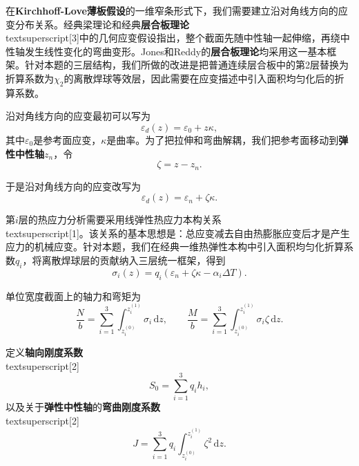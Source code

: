 \documentclass[draft,12pt,a4paper]{ctexart}
\theoremstyle{definition}
\newcommand{\diff}{\mathrm{d}}
\begin{document}
在\textbf{Kirchhoff-Love薄板假设}的一维窄条形式下，我们需要建立沿对角线方向的应变分布关系。经典梁理论和经典\textbf{层合板理论}\\textsuperscript{[3]}中的几何应变假设指出，整个截面先随中性轴一起伸缩，再绕中性轴发生线性变化的弯曲变形。Jones和Reddy的\textbf{层合板理论}均采用这一基本框架。针对本题的三层结构，我们所做的改进是把普通连续层合板中的第2层替换为折算系数为$\chi_2$的离散焊球等效层，因此需要在应变描述中引入面积均匀化后的折算系数。

沿对角线方向的应变最初可以写为
\begin{equation}\label{eq:strain}
\varepsilon_d(z)=\varepsilon_0+z\kappa,
\end{equation}
其中$\varepsilon_0$是参考面应变，$\kappa$是曲率。为了把拉伸和弯曲解耦，我们把参考面移动到\textbf{弹性中性轴}$z_n$，令
\begin{equation}
\zeta=z-z_n.
\end{equation}

于是沿对角线方向的应变改写为
\begin{equation}\label{eq:strain-neutral}
\varepsilon_d(z)=\varepsilon_n+\zeta\kappa.
\end{equation}

第$i$层的热应力分析需要采用线弹性热应力本构关系\\textsuperscript{[1]}。该关系的基本思想是：总应变减去自由热膨胀应变后才是产生应力的机械应变。针对本题，我们在经典一维热弹性本构中引入面积均匀化折算系数$q_i$，将离散焊球层的贡献纳入三层统一框架，得到
\begin{equation}\label{eq:constitutive}
\sigma_i(z)=q_i\left(\varepsilon_n+\zeta\kappa-\alpha_i\Delta T\right).
\end{equation}

单位宽度截面上的轴力和弯矩为
\begin{equation}\label{eq:force-moment}
\frac{N}{b}=\sum_{i=1}^{3}\int_{z_i^{(0)}}^{z_i^{(1)}}\sigma_i\,\diff z,
\qquad
\frac{M}{b}=\sum_{i=1}^{3}\int_{z_i^{(0)}}^{z_i^{(1)}}\sigma_i\zeta\,\diff z.
\end{equation}

定义\textbf{轴向刚度系数}\\textsuperscript{[2]}
\begin{equation}\label{eq:S0}
S_0=\sum_{i=1}^{3}q_i h_i,
\end{equation}
以及关于\textbf{弹性中性轴}的\textbf{弯曲刚度系数}\\textsuperscript{[2]}
\begin{equation}\label{eq:J}
J=\sum_{i=1}^{3}q_i\int_{z_i^{(0)}}^{z_i^{(1)}}\zeta^2\,\diff z.
\end{equation}
\end{document}
